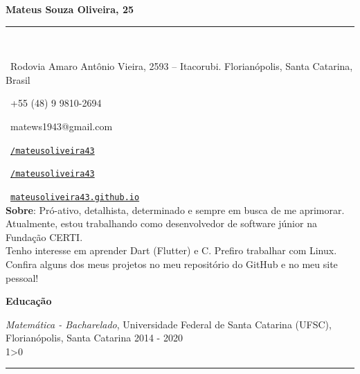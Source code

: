 \documentclass[a4paper,10pt]{article}
\makeatletter
\newcommand{\profissional}{Mateus Souza Oliveira}
\newcommand{\idade}{25}
\newcommand{\Endereco}{Rodovia Amaro Antônio Vieira, 2593 -- Itacorubi. Florianópolis, Santa Catarina, Brasil}
\newcommand{\telefone}{+55 (48) 9 9810-2694}
\newcommand{\email}{matews1943@gmail.com}
\newcommand{\sobre}{
    Pró-ativo, detalhista, determinado e sempre em busca de me aprimorar. Atualmente, estou trabalhando como desenvolvedor de software júnior na Fundação CERTI. \\

    Tenho interesse em aprender Dart (Flutter) e C. Prefiro trabalhar com Linux. Confira alguns dos meus projetos no meu repositório do GitHub e no meu site pessoal!
    \vspace{2\baselineskip}
}
\newcommand{\criaSecao}[4][0]{
    \noindent
	\begin{minipage}{0.16\linewidth}
		\large{\textbf{#2}}
		\vspace{#3\baselineskip}
	\end{minipage}
	\hfill
	\begin{minipage}{0.79\linewidth}
		#4
		\ifnum0#1>0 { \hrule {\ } } \fi
	\end{minipage}
	\vspace{\baselineskip}
}
\makeatother
\begin{document}
	\begin{minipage}{0.65\linewidth}
		\Huge{\bf \profissional, \idade}\\\vspace{-1.75\baselineskip}

		\noindent\rule{\textwidth}{1.5pt} {\ }\\\vspace{-1.8\baselineskip}

		\large{
		\faMapMarker \ \Endereco \\
		\begin{minipage}{0.5\linewidth}
			\faWhatsapp \ \telefone
		\end{minipage}
		\begin{minipage}{0.5\linewidth}
			\faEnvelope \ \email
		\end{minipage}
		\begin{minipage}{0.5\linewidth}
			\faLinkedinSquare \ \href{https://www.linkedin.com/in/mateusoliveira43/}{\texttt{/mateusoliveira43}}
		\end{minipage}
		\begin{minipage}{0.5\linewidth}
			\faGithub \ \href{https://github.com/mateusoliveira43}{\texttt{/mateusoliveira43}}
		\end{minipage}
		\faLink \ \href{https://mateusoliveira43.github.io/}{\texttt{mateusoliveira43.github.io}}\\
		\vfill
		\textbf{Sobre}:\sobre
		}
	\end{minipage}
	\vspace{\baselineskip}

    \criaSecao[1]{Educação}{2}{
		\textit{Matemática - Bacharelado}, Universidade Federal de Santa Catarina (UFSC), Florianópolis, Santa Catarina \hfill 2014 - 2020 \\
    }
\end{document}
